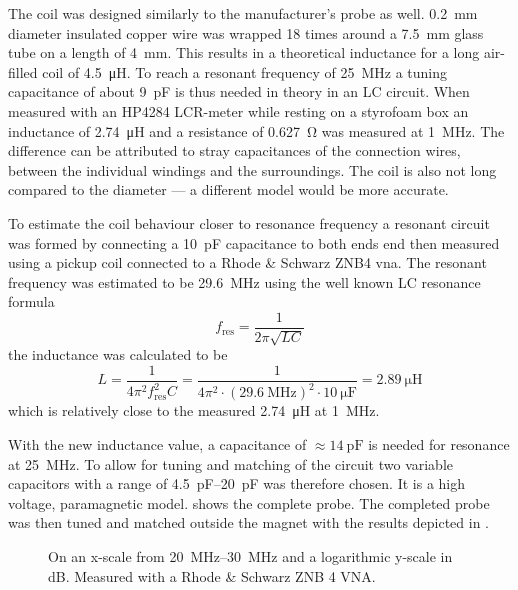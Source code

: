 The coil was designed similarly to the manufacturer's probe as well. \qty{0.2}{\milli\metre} diameter insulated copper wire was wrapped 18 times around a \qty{7.5}{\milli\metre} glass tube on a length of \qty{4}{\milli\metre}. This results in a theoretical inductance for a long air-filled coil of \qty{4.5}{\micro\henry}. To reach a resonant frequency of \qty{25}{\mega\hertz} a tuning capacitance of about \qty{9}{\pico\farad} is thus needed in theory in an LC circuit. When measured with an HP4284 LCR-meter while resting on a styrofoam box an inductance of \qty{2.74}{\micro\henry} and a resistance of \qty{0.627}{\ohm} was measured at \qty{1}{\mega\hertz}. The difference can be attributed to stray capacitances of the connection wires, between the individual windings and the surroundings. The coil is also not long compared to the diameter --- a different model would be more accurate.

To estimate the coil behaviour closer to resonance frequency a resonant circuit was formed by connecting a \qty{10}{\pico\farad} capacitance to both ends end then measured using a pickup coil connected to a Rhode \& Schwarz ZNB4 \acrshort{vna}. The resonant frequency was estimated to be \qty{29.6}{\mega\hertz} using the well known LC resonance formula
\[
    f_{\text{res}} = \frac{1}{2\pi{}\sqrt{LC}}
\]
the inductance was calculated to be
\[
    L = \frac{1}{4\pi{}^2f_{\text{res}}^2C} = \frac{1}{4\pi{}^2 \cdot{} (\qty{29.6}{\mega\hertz})^2 \cdot{} \qty{10}{\micro\farad}} = \qty{2.89}{\micro\henry}
\] which is relatively close to the measured \qty{2.74}{\micro\henry} at \qty{1}{\mega\hertz}.

With the new inductance value, a capacitance of \(\approx{}\qty{14}{\pico\farad}\) is needed for resonance at \qty{25}{\mega\hertz}. To allow for tuning and matching of the circuit two variable capacitors with a range of \qtyrange{4.5}{20}{\pico\farad} was therefore chosen. It is a high voltage, paramagnetic model.  shows the complete probe. The completed probe was then tuned and matched outside the magnet with the results depicted in .

\begin{figure}[hbt]
    \centering
    
    \caption{ On an x-scale from \qtyrange{20}{30}{\mega\hertz} and a logarithmic y-scale in \unit{\deci\bel}. Measured with a Rhode \& Schwarz ZNB 4 VNA.}
\end{figure}

